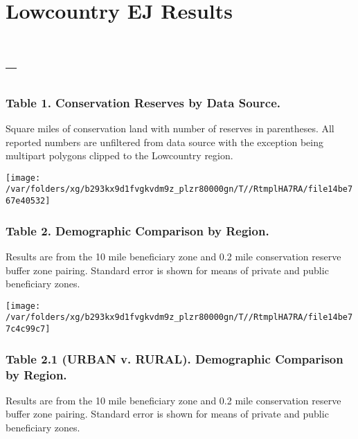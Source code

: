 \documentclass[landscape]{article}
\author{}
\date{\vspace{-2.5em}}
\begin{document}
\hypertarget{lowcountry-ej-results}{%
\section{Lowcountry EJ Results}\label{lowcountry-ej-results}}

\hypertarget{section}{%
\section{--}\label{section}}

\hypertarget{table-1.-conservation-reserves-by-data-source.}{%
\subsubsection{Table 1. Conservation Reserves by Data
Source.}\label{table-1.-conservation-reserves-by-data-source.}}

Square miles of conservation land with number of reserves in
parentheses. All reported numbers are unfiltered from data source with
the exception being multipart polygons clipped to the Lowcountry region.

\texttt{[image: /var/folders/xg/b293kx9d1fvgkvdm9z\_plzr80000gn/T//RtmplHA7RA/file14be767e40532]}

\hypertarget{table-2.-demographic-comparison-by-region.}{%
\subsubsection{Table 2. Demographic Comparison by
Region.}\label{table-2.-demographic-comparison-by-region.}}

Results are from the 10 mile beneficiary zone and 0.2 mile conservation
reserve buffer zone pairing. Standard error is shown for means of
private and public beneficiary zones.

\texttt{[image: /var/folders/xg/b293kx9d1fvgkvdm9z\_plzr80000gn/T//RtmplHA7RA/file14be77c4c99c7]}
\pagebreak

\hypertarget{table-2.1-urban-v.-rural.-demographic-comparison-by-region.}{%
\subsubsection{Table 2.1 (URBAN v. RURAL). Demographic Comparison by
Region.}\label{table-2.1-urban-v.-rural.-demographic-comparison-by-region.}}

Results are from the 10 mile beneficiary zone and 0.2 mile conservation
reserve buffer zone pairing. Standard error is shown for means of
private and public beneficiary zones.
\end{document}
